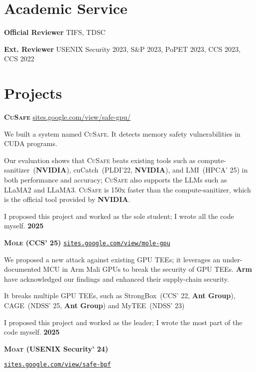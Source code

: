 \documentclass{resume}
\begin{document}
\section{Academic Service}
\begin{content}
  {\bf Official Reviewer} \enspace TIFS, TDSC

		{\bf Ext. Reviewer} \enspace USENIX Security 2023, S\&P 2023, PoPET 2023, CCS 2023, CCS 2022
\end{content}

\section{Projects}

\begin{content}
  {\bf \textbf{\textsc{CuSafe}}} \enspace
  {\href{https://sites.google.com/view/safe-gpu/}{sites.google.com/view/safe-gpu/}}

  {We built a system named \textsc{CuSafe}. It detects memory safety vulnerabilities in CUDA programs.}

  {Our evaluation shows that \textsc{CuSafe} beats existing tools such as compute-sanitizer~(\textbf{NVIDIA}), cuCatch~(PLDI'22, \textbf{NVIDIA}), and LMI~(HPCA' 25) in both performance and accuracy; \textsc{CuSafe} also supports the LLMs such as LLaMA2 and LLaMA3. \textsc{CuSafe} is 150x faster than the compute-sanitizer, which is the official tool provided by \textbf{NVIDIA}.}

  {I proposed this project and worked as the sole student; I wrote all the code myself.}
  \hfill {\bf 2025}


  {\bf \textbf{\textsc{Mole}} (CCS' 25)} \enspace
  {\href{https://sites.google.com/view/mole-gpu}{\texttt{sites.google.com/view/mole-gpu}}}

  {We proposed a new attack against existing GPU TEEs; it leverages an under-documented MCU in Arm Mali GPUs to break the security of GPU TEEs. \textbf{Arm} have acknowledged our findings and enhanced their supply-chain security.}

  {It breaks multiple GPU TEEs, such as StrongBox~(CCS' 22, \textbf{Ant Group}), CAGE~(NDSS' 25, \textbf{Ant Group}) and MyTEE~(NDSS' 23)}

  {I proposed this project and worked as the leader; I wrote the most part of the code myself.}
  \hfill{\bf 2025}


  {\bf \textbf{\textsc{Moat}} (USENIX Security' 24)} \enspace
  {\href{https://sites.google.com/view/safe-bpf/}{\texttt{sites.google.com/view/safe-bpf}}
    
}
\end{content}
\end{document}
